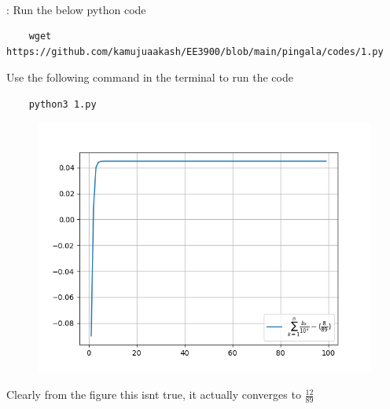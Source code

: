 \documentclass[journal,12pt,twocolumn]{IEEEtran}
\renewcommand\thesection{\arabic{section}}
\begin{document}
\begin{enumerate}[label=\thesection.\arabic*
,ref=\thesection.\theenumi]
\begin{align}
\end{align}
\solution:
Run the below python code 
\begin{lstlisting}
	wget https://github.com/kamujuaakash/EE3900/blob/main/pingala/codes/1.py
\end{lstlisting}
Use the following command in the terminal to run the code
\begin{lstlisting}
	python3 1.py
\end{lstlisting}
\begin{figure}[h]
	\centering
	\includegraphics[width=0.7\columnwidth]{./figs/1_4.png}
	\caption{}
\end{figure}
Clearly from the figure this isnt true, it actually converges to $\frac{12}{89}$
\end{enumerate}
\end{document}
